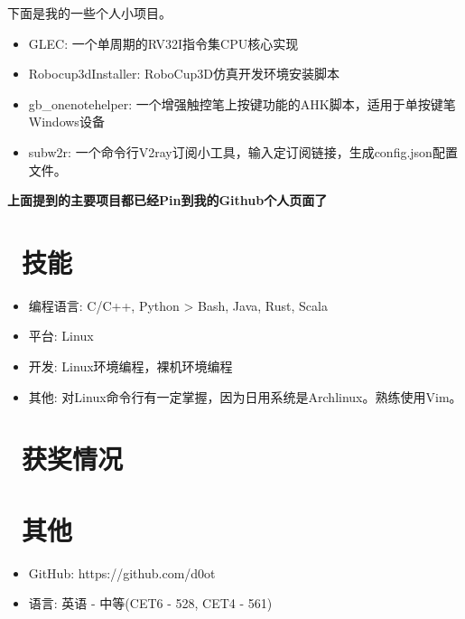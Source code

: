 \documentclass{resume}
\begin{document}
\begin{onehalfspacing}
下面是我的一些个人小项目。
\begin{itemize}
  \item GLEC: 一个单周期的RV32I指令集CPU核心实现
  \item Robocup3dInstaller: RoboCup3D仿真开发环境安装脚本
  \item gb\_onenotehelper: 一个增强触控笔上按键功能的AHK脚本，适用于单按键笔Windows设备
  \item subw2r: 一个命令行V2ray订阅小工具，输入定订阅链接，生成config.json配置文件。
\end{itemize}
\end{onehalfspacing}

\begin{onehalfspacing}
\textbf{上面提到的主要项目都已经Pin到我的Github个人页面了}
\end{onehalfspacing}


\section{\faCogs\ 技能}
\begin{itemize}[parsep=0.5ex]
  \item 编程语言: C/C++, Python > Bash, Java, Rust, Scala
  \item 平台: Linux
  \item 开发: Linux环境编程，裸机环境编程
  \item 其他: 对Linux命令行有一定掌握，因为日用系统是Archlinux。熟练使用Vim。

\end{itemize}


\section{\faHeartO\ 获奖情况}


\section{\faInfo\ 其他}
\begin{itemize}[parsep=0.5ex]
  \item GitHub: https://github.com/d0ot
  \item 语言: 英语 - 中等(CET6 - 528, CET4 - 561)
\end{itemize}

%
%
\end{document}
